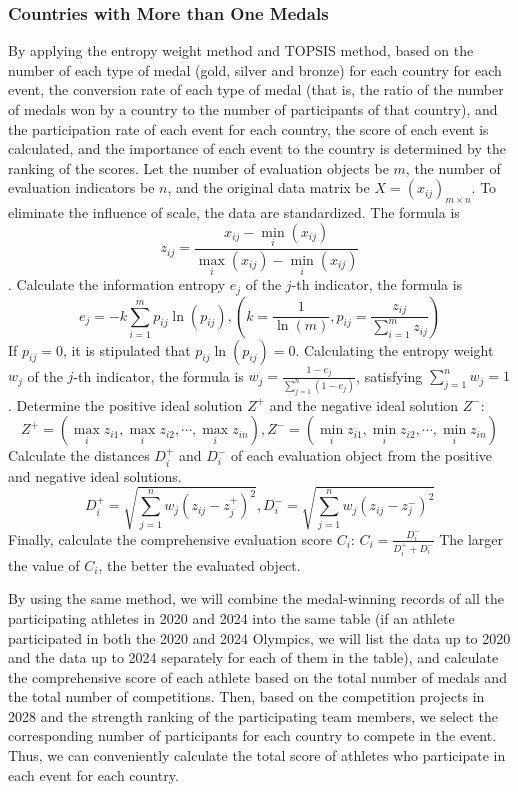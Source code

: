 \documentclass{mcmthesis}  %
\begin{document}
\subsubsection{Countries with More than One Medals}  %
\hspace*{1.5em}By applying the entropy weight method and TOPSIS method, based on the number of each type of medal (gold, silver and bronze) for each country for each event, the conversion rate of each type of medal (that is, the ratio of the number of medals won by a country to the number of participants of that country), and the participation rate of each event for each country, the score of each event is calculated, and the importance of each event to the country is determined by the ranking of the scores. Let the number of evaluation objects be \(m\), the number of evaluation indicators be \(n\), and the original data matrix be \(X = (x_{ij})_{m \times n}\). To eliminate the influence of scale, the data are standardized. The formula is $$z_{ij} = \frac{x_{ij} - \min_{i}(x_{ij})}{\max_{i}(x_{ij}) - \min_{i}(x_{ij})}$$. Calculate the information entropy \(e_j\) of the \(j\)-th indicator, the formula is $$e_j = -k \sum_{i = 1}^{m} p_{ij} \ln(p_{ij}), (k = \frac{1}{\ln(m)}, p_{ij} = \frac{z_{ij}}{\sum_{i = 1}^{m} z_{ij}}) $$If \(p_{ij} = 0\), it is stipulated that \(p_{ij} \ln(p_{ij}) = 0\). Calculating the entropy weight \(w_j\) of the \(j\)-th indicator, the formula is $w_j = \frac{1 - e_j}{\sum_{j = 1}^{n} (1 - e_j)}$, satisfying \(\sum_{j = 1}^{n} w_j = 1\). Determine the positive ideal solution \(Z^+\) and the negative ideal solution \(Z^-\): \[Z^+ = (\max_{i}z_{i1},\max_{i}z_{i2},\cdots,\max_{i}z_{in}), Z^- = (\min_{i}z_{i1},\min_{i}z_{i2},\cdots,\min_{i}z_{in})\]
Calculate the distances \(D_i^+\) and \(D_i^-\) of each evaluation object from the positive and negative ideal solutions. \[D_i^+=\sqrt{\sum_{j = 1}^{n}w_j(z_{ij}-z_{j}^+)^2},D_i^-=\sqrt{\sum_{j = 1}^{n}w_j(z_{ij}-z_{j}^-)^2}\]
Finally, calculate the comprehensive evaluation score \(C_i\): $C_i=\frac{D_i^-}{D_i^++D_i^-}$
The larger the value of \(C_i\), the better the evaluated object.

By using the same method, we will combine the medal-winning records of all the participating athletes in 2020 and 2024 into the same table (if an athlete participated in both the 2020 and 2024 Olympics, we will list the data up to 2020 and the data up to 2024 separately for each of them in the table), and calculate the comprehensive score of each athlete based on the total number of medals and the total number of competitions.
Then, based on the competition projects in 2028 and the strength ranking of the participating team members, we select the corresponding number of participants for each country to compete in the event. Thus, we can conveniently calculate the total score of athletes who participate in each event for each country.
\end{document}
